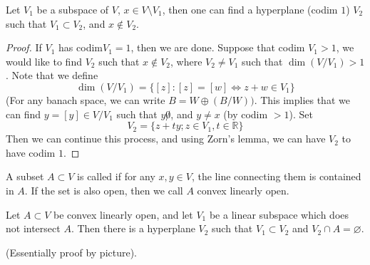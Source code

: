 \documentclass[openany]{book}
\newcommand{\R}{\mathbb{R}}
\let\emptyset\varnothing
\begin{document}
\begin{prop}
    Let $V_1$ be a subspace of $V$, $x\in V\setminus V_1$, then one can find a hyperplane (codim $1$) $V_2$ such that $V_1\subset V_2$, and $x\not\in V_2$. 
\end{prop}
\begin{proof}
    If $V_1$ has codim$V_1=1$, then we are done. Suppose that codim $V_1>1$, we would like to find $V_2$ such that $x\not\in V_2$, where $V_2\neq V_1$ such that $\dim(V/V_1)>1$. Note that we define 
    \begin{equation*}
        \dim(V/V_1)=\{[z]: [z]=[w] \iff z+w\in V_1\}
    \end{equation*} 
    (For any banach space, we can write $B=W\oplus(B/W))$. This implies that we can find $y=[y]\in V/V_1$ such that $y\not0$, and $y\neq x$ (by codim $>1$). Set 
    \begin{equation*}
        V_2=\{z+ty; z\in V_1, t\in\R\}
    \end{equation*}
    Then we can continue this process, and using Zorn's lemma, we can have $V_2$ to have codim $1$.
\end{proof}

\begin{defn}
    A subset $A\subset V$ is called  if for any $x,y\in V$, the line connecting them is contained in $A$. If the set is also open, then we call $A$ convex linearly open.
\end{defn}

\begin{prop}
    Let $A\subset V$ be convex linearly open, and let $V_1$ be a linear subspace which does not intersect $A$. Then there is a hyperplane  $V_2$ such that $V_1\subset V_2$ and $V_2\cap A=\emptyset$.
\end{prop}
(Essentially proof by picture).
\end{document}
